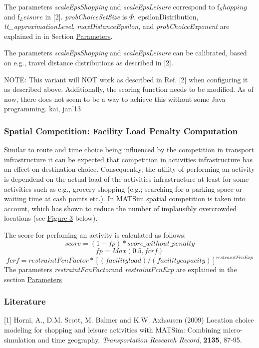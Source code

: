 \documentclass[a4paper,11pt]{report}
\begin{document}
The parameters \emph{scaleEpsShopping }and \emph{scaleEpsLeisure }correspond to f$_Shopping$ and f$_Leisure$ in [2]. \emph{probChoiceSetSize }is $\Phi$, epsilonDistribution, \emph{tt\_}\emph{approximationLevel}, \emph{maxDistanceEpsilon}, and \emph{probChoiceExponent }are explained in in Section \hyperlink{parameters}{Parameters}.

The parameters \emph{scaleEpsShopping }and \emph{scaleEpsLeisure }can be calibrated, based on e.g., travel distance distributions as described in [2].

NOTE: This  variant will NOT work as described in Ref. [2] when configuring it as  described above. Additionally, the scoring function needs to be  modified. As of now, there does not seem to be a way to achieve  this without some Java programming. kai, jan'13

\subsubsection{\textbf{Spatial Competition: Facility Load Penalty Computation}}

Similar to route and time choice being influenced by  the competition in transport infrastructure it can be expected that  competition in activities infrastructure has an effect on destination  choice. Consequently, the utility of performing an activity is dependend  on the actual load of the activities infrastructure at least for some  activities such as e.g., grocery shopping (e.g.; searching for a parking  space or waiting time at cash points etc.). In MATSim spatial  competition is taken into account, which has shown to reduce the number  of implausibly overcrowded locations (see \hyperlink{Figure3}{Figure 3} below).

The score for perfoming an activity is calculated as follows:
\[
score = (1- fp) * score\_without\_penalty
\]
\[
fp = Max(0.5, fcrf)
\]
\[
fcrf = restraintFcnFactor * [(facility load) / (facility capacity)]^{restraintFcnExp}
\]
The parameters \emph{restraintFcnFactor}and \emph{restraintFcnExp }are explained in the section \hyperlink{parameters}{Parameters}


\subsubsection{\textbf{Literature}}

[1] Horni, A., D.M. Scott, M. Balmer and K.W. Axhausen (2009)  Location choice modeling for shopping and leisure activities with  MATSim: Combining micro-simulation and time geography, \emph{Transportation Research Record}, \textbf{2135}, 87-95.
\end{document}

